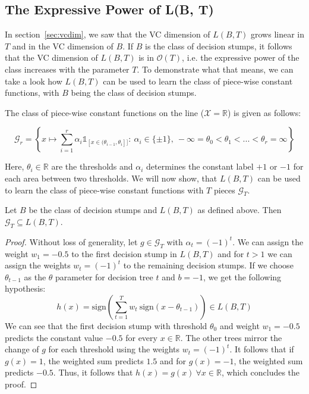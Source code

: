 \subsection{The Expressive Power of L(B, T)}

In section~\ref{sec:vcdim}, we saw that the VC dimension of $L(B, T)$ grows linear in $T$ and in the VC dimension of
$B$. If $B$ is the class of decision stumps, it follows that the VC dimension
of $L(B, T)$ is in $\mathcal{O}(T)$, i.e. the expressive power of the class increases with the parameter $T$.
To demonstrate what that means, we can take a look how $L(B, T)$ can be used to learn the class of piece-wise constant
functions, with $B$ being the class of decision stumps.

The class of piece-wise constant functions on the line ($\mathcal{X} = \mathbb{R}$) is given as follows:
\begin{linenomath*}
    $$
    \mathcal{G}_r = \left \{ x \mapsto \sum_{i=1}^r \alpha_i \mathds{1}_{[x \in (\theta_{i-1}, \theta_i]]}: \ 
        \alpha_i \in \{\pm 1 \},\  -\infty = \theta_0 < \theta_1 < ... < \theta_r = \infty \right \}
    $$
\end{linenomath*}
Here, $\theta_i \in \mathbb{R}$ are the thresholds and $\alpha_i$ determines the constant label $+1$ or $-1$
for each area between two thresholds. We will now show, that $L(B, T)$ can be used to learn the class
of piece-wise constant functions with $T$ pieces $\mathcal{G}_T$.

\begin{theorem}
\label{thm:piece-wise}
\begin{linenomath*}
	Let $B$ be the class of decision stumps and $L(B, T)$ as defined above.
	Then $\mathcal{G}_T \subseteq L(B, T)$.
\end{linenomath*}
\end{theorem}
\begin{proof}
	Without loss of generality, let $g \in \mathcal{G}_T$ with $\alpha_t = (-1)^t$. We can assign the weight
	$w_1=-0.5$ to the first decision stump in $L(B, T)$ and for $t > 1$ we can assign the weights $w_t = (-1)^t$
	to the remaining decision stumps. If we choose $\theta_{t-1}$ as the $\theta$ parameter for decision
	tree $t$ and $b=-1$, we get the following hypothesis:
	$$
	    h(x) = \text{sign} \left( \sum_{t=1}^T w_t \  \text{sign} (x - \theta_{t-1}) \right) \in L(B, T)
	$$
	We can see that the first decision stump with threshold $\theta_{0}$ and weight $w_1 = -0.5$ predicts the
	constant value $-0.5$ for every $x \in \mathbb{R}$. The other trees mirror the change of $g$ for each threshold
	using the weights $w_t = (-1)^t$. It follows that if $g(x) = 1$, the weighted sum predicts $1.5$ and for
	$g(x) = -1$, the weighted sum predicts $-0.5$. Thus, it follows that $h(x) = g(x)\  \forall x \in \mathbb{R}$,
	which concludes the proof.
\end{proof}

